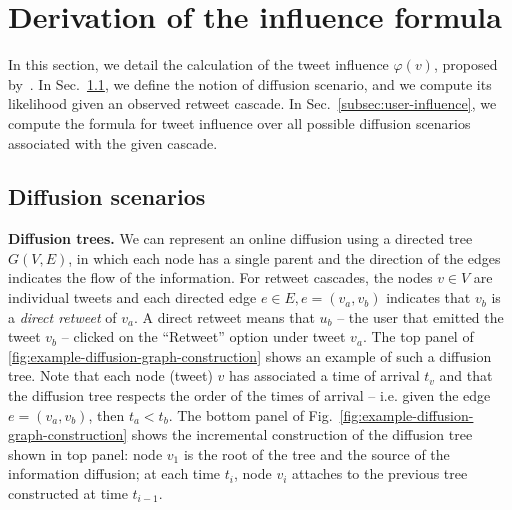 %

\section{Derivation of the influence formula}
\label{si-sec:infl-derivation}

In this section, we detail the calculation of the tweet influence $\varphi(v)$, proposed by~\citet{Rizoiu2018a}.
In Sec.~\ref{subsec:diffusion-scenario}, we define the notion of diffusion scenario, and we compute its likelihood given an observed retweet cascade.
In Sec.~\ref{subsec:user-influence}, we compute the formula for tweet influence over all possible diffusion scenarios associated with the given cascade.

\subsection{Diffusion scenarios}
\label{subsec:diffusion-scenario}

\textbf{Diffusion trees.}
We can represent an online diffusion using a directed tree $G(V, E)$, in which each node has a single parent and the direction of the edges indicates the flow of the information.
For retweet cascades, the nodes $v \in V$ are individual tweets and each directed edge $e \in E, e = (v_a, v_b)$ 
indicates that $v_b$ is a \emph{direct retweet} of $v_a$.
A direct retweet means that $u_b$ -- the user that emitted the tweet $v_b$ -- clicked on the ``Retweet'' option under tweet $v_a$.
The top panel of \cref{fig:example-diffusion-graph-construction} shows an example of such a diffusion tree.
Note that each node (tweet) $v$ has associated a time of arrival $t_v$ and that the diffusion tree respects the order of the times of arrival -- i.e. given the edge $e = (v_a, v_b)$, then $t_a < t_b$.
The bottom panel of Fig.~\ref{fig:example-diffusion-graph-construction} shows the incremental construction of the diffusion tree shown in top panel:
node $v_1$ is the root of the tree and the source of the information diffusion; 
at each time $t_i$, node $v_i$ attaches to the previous tree constructed at time $t_{i-1}$.


